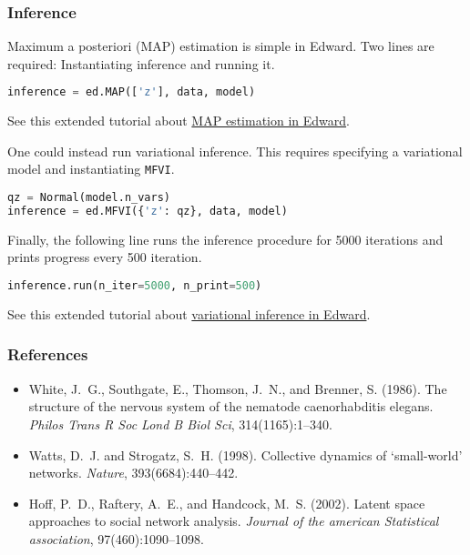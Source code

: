 \subsubsection{Inference}

Maximum a posteriori (MAP) estimation is simple in Edward. Two lines are
required: Instantiating inference and running it.
\begin{lstlisting}[language=Python]
inference = ed.MAP(['z'], data, model)
\end{lstlisting}

See this extended tutorial about
\href{tut_MAP.html}{MAP estimation in Edward}.

One could instead run variational inference. This requires specifying
a variational model and instantiating \texttt{MFVI}.
\begin{lstlisting}[language=Python]
qz = Normal(model.n_vars)
inference = ed.MFVI({'z': qz}, data, model)
\end{lstlisting}
Finally, the following line runs the inference procedure for 5000
iterations and prints progress every 500 iteration.
\begin{lstlisting}[language=Python]
inference.run(n_iter=5000, n_print=500)
\end{lstlisting}
See this extended tutorial about
\href{tut_variational_inference.html}{variational inference in Edward}.

\subsubsection{References}

\begin{itemize}
\item
White, J.~G., Southgate, E., Thomson, J.~N., and Brenner, S. (1986).
\newblock The structure of the nervous system of the nematode caenorhabditis
  elegans.
\newblock \emph{Philos Trans R Soc Lond B Biol Sci}, 314(1165):1--340.
\item
Watts, D.~J. and Strogatz, S.~H. (1998).
\newblock Collective dynamics of ‘small-world’ networks.
\newblock \emph{Nature}, 393(6684):440--442.
\item
Hoff, P.~D., Raftery, A.~E., and Handcock, M.~S. (2002).
\newblock Latent space approaches to social network analysis.
\newblock \emph{Journal of the american Statistical association},
  97(460):1090--1098.
\end{itemize}
